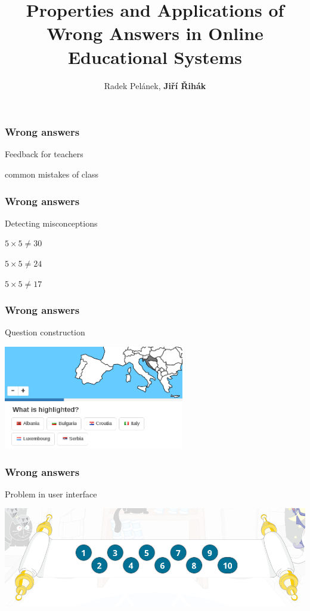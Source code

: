 \documentclass[xcolor=svgnames]{beamer}
\title[Wrong Answers]{Properties and Applications of Wrong Answers in Online Educational Systems}
\author{Radek Pelánek, \textbf{Ji\v{r}í \v{R}ihák}}
\institute{Masaryk University Brno}
\date{}
\begin{document}
\frame[plain]{\titlepage}
\begin{frame}
    \frametitle{Wrong answers}
    \centering
    \LARGE
    Feedback for teachers

    \vfill
    \large
    common mistakes of class
\end{frame}
\begin{frame}
    \frametitle{Wrong answers}
    \centering
    \LARGE
    Detecting misconceptions
    \vfill

    $ 5 \times 5 \neq 30$

    $ 5 \times 5 \neq 24$

    $ 5 \times 5 \neq 17$

\end{frame}
\begin{frame}
    \frametitle{Wrong answers}
    \centering
    \LARGE
    Question construction

    \vfill
    \includegraphics[height=4.5cm]{figures/question.png}
\end{frame}
\begin{frame}
    \frametitle{Wrong answers}
    \centering
    \LARGE
    Problem in user interface

    \vfill
    \includegraphics[width=\linewidth]{figures/keyboard.png}
\end{frame}
\end{document}
